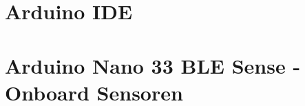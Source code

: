 \documentclass[10pt,a4paper,bibliography=totoc]{scrbook}
\begin{document}


\tableofcontents
\cleardoublepage

\listoffigures
\cleardoublepage

\listofcodes
\cleardoublepage

\cleardoublepage


  



{
\part{Arduino IDE}

      
  
   
  
}



{


\part{Arduino Nano 33 BLE Sense - Onboard Sensoren}

  

}
\end{document}
